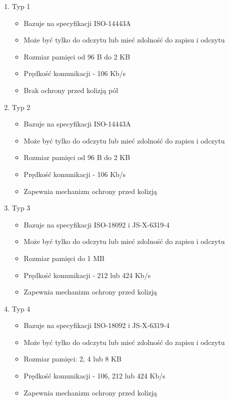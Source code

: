 \begin{enumerate}
	\item Typ 1
	\begin{itemize}
		\item Bazuje na specyfikacji ISO-14443A
		\item Może być tylko do odczytu lub mieć zdolność do zapisu i odczytu
		\item Rozmiar pamięci od 96 B do 2 KB
		\item Prędkość komunikacji - 106 Kb/s
		\item Brak ochrony przed kolizją pól
	\end{itemize}
	
	\item Typ 2
	\begin{itemize}
		\item Bazuje na specyfikacji ISO-14443A
		\item Może być tylko do odczytu lub mieć zdolność do zapisu i odczytu
		\item Rozmiar pamięci od 96 B do 2 KB
		\item Prędkość komunikacji - 106 Kb/s
		\item Zapewnia mechanizm ochrony przed kolizją
	\end{itemize}
	
	\item Typ 3
	\begin{itemize}
		\item Bazuje na specyfikacji ISO-18092 i JS-X-6319-4
		\item Może być tylko do odczytu lub mieć zdolność do zapisu i odczytu
		\item Rozmiar pamięci do 1 MB
		\item Prędkość komunikacji - 212 lub 424 Kb/s
		\item Zapewnia mechanizm ochrony przed kolizją
	\end{itemize}
	\clearpage
	\item Typ 4
	\begin{itemize}
		\item Bazuje na specyfikacji ISO-18092 i JS-X-6319-4
		\item Może być tylko do odczytu lub mieć zdolność do zapisu i odczytu
		\item Rozmiar pamięci: 2, 4 lub 8 KB
		\item Prędkość komunikacji - 106, 212 lub 424 Kb/s
		\item Zapewnia mechanizm ochrony przed kolizją
	\end{itemize}
	
\end{enumerate}


